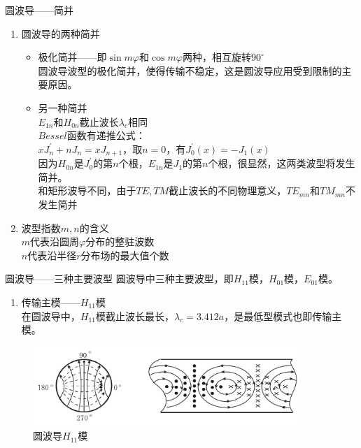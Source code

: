 \begin{frame}{圆波导——简并}
    \begin{enumerate}
        \resume
        \item 圆波导的两种简并\\
              \begin{itemize}
                  \item 极化简并——即$\sin m\varphi$和$\cos m\varphi$两种，相互旋转$90^{\circ}$ \\
                        \footnotesize{圆波导波型的极化简并，使得传输不稳定，这是圆波导应用受到限制的主要原因。}
                  \item 另一种简并\\
                        \footnotesize{
                        $E_{1n}和H_{0n}$截止波长$\lambda_c$相同\\
                        $Bessel$函数有递推公式：\\
                        $xJ_n^{'}+nJ_n=xJ_{n+1}$，取$n=0$，有$J_0^{'}(x)=-J_1(x)$\\
                        因为$H_{0n}$是$J_0^{'}$的第$n$个根，$E_{1n}$是$J_1$的第$n$个根，很显然，这两类波型将发生简并。\\
                        和矩形波导不同，由于$TE,TM$截止波长的不同物理意义，$TE_{mn}$和$TM_{mn}$不发生简并
                        }
              \end{itemize}
        \item 波型指数$m,n$的含义\\
              $m$代表沿圆周$\varphi$分布的整驻波数\\
              $n$代表沿半径$r$分布场的最大值个数
    \end{enumerate}
\end{frame}

\begin{frame}{圆波导——三种主要波型}
    圆波导中三种主要波型，即$H_{11}$模，$H_{01}$模，$E_{01}$模。
    \begin{enumerate}
        \item 传输主模——$H_{11}$模\\
              在圆波导中，$H_{11}$模截止波长最长，$\lambda_c=3.412a$，是最低型模式也即传输主模。
              \saveenum
    \end{enumerate}
    \begin{figure}
        \includegraphics[width=10cm]{Cha6//fig6-21.png}
        \caption{圆波导$H_{11}$模}
    \end{figure}
\end{frame}

